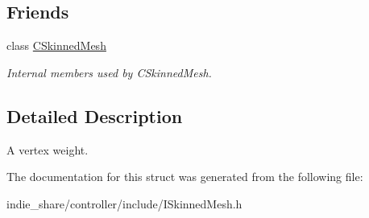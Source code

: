\subsection*{Friends}
\begin{DoxyCompactItemize}
\item 
\mbox{\label{structirr_1_1scene_1_1ISkinnedMesh_1_1SWeight_a98554561a5c71bdc9be78be1a91d1a08}} 
class \hyperlink{structirr_1_1scene_1_1ISkinnedMesh_1_1SWeight_a98554561a5c71bdc9be78be1a91d1a08}{C\+Skinned\+Mesh}
\begin{DoxyCompactList}\small\item\em Internal members used by C\+Skinned\+Mesh. \end{DoxyCompactList}\end{DoxyCompactItemize}


\subsection{Detailed Description}
A vertex weight. 

The documentation for this struct was generated from the following file\+:\begin{DoxyCompactItemize}
\item 
indie\+\_\+share/controller/include/I\+Skinned\+Mesh.\+h\end{DoxyCompactItemize}
